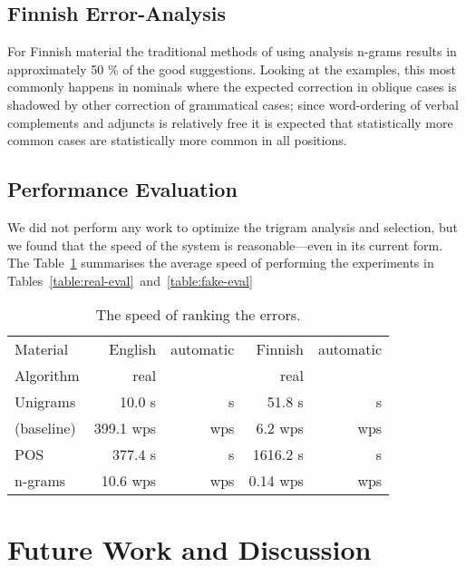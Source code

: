 \documentclass{llncs}
\begin{document}
\subsection{Finnish Error-Analysis}

For Finnish material the traditional methods of using analysis n-grams results
in approximately 50 \% of the good suggestions. Looking at the examples, this
most commonly happens in nominals where the expected correction in oblique
cases is shadowed by other correction of grammatical cases; since word-ordering
of verbal complements and adjuncts is relatively free it is expected that
statistically more common cases are statistically more common in all positions.

\subsection{Performance Evaluation}

We did not perform any work to optimize the trigram analysis and selection,
but we found that the speed of the system is reasonable---even in its current
form. The Table~\ref{table:speed-eval} summarises the average
speed of performing the experiments in Tables~\ref{table:real-eval}~and~\ref{table:fake-eval}

\begin{table}
    \caption{The speed of ranking the errors.
    \label{table:speed-eval}}
  \begin{center}
      \begin{tabular}{lrrrr}
        \hline
        Material  & English & automatic & Finnish & automatic \\
        Algorithm & real    &           & real    &           \\
        \hline
        Unigrams   &    10.0 s &      s & 51.8 s &     s  \\
        (baseline) & 399.1 wps &    wps & 6.2 wps &   wps  \\
        \hline
        POS      &   377.4 s &     s & 1616.2 s &     s  \\
        n-grams  & 10.6  wps &   wps & 0.14 wps &   wps  \\
        \hline
      \end{tabular}
  \end{center}
\end{table}


\section{Future Work and Discussion}
\label{sec:future-work}
\end{document}
